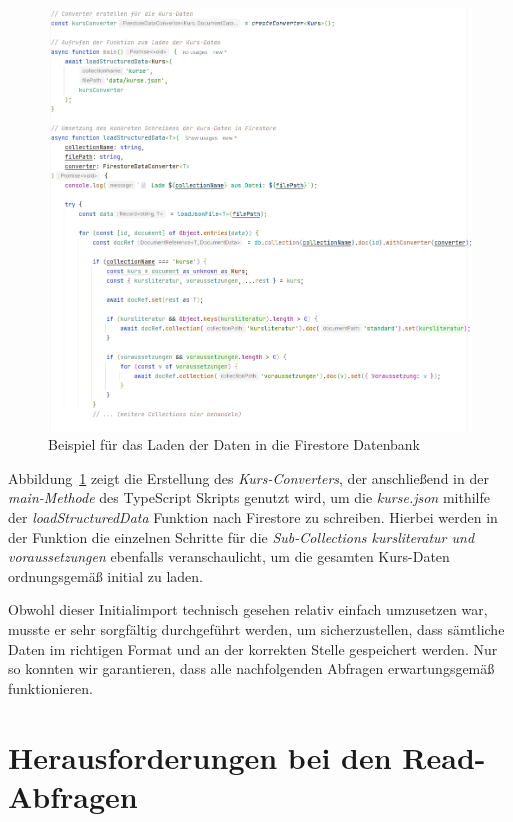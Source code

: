 \documentclass[12pt,a4paper%
              ,oneside     %
              ,titlepage
              ,DIV=13
              ,headinclude
              ,footinclude=false%
              ,cleardoublepage=empty%
              ,parskip=half,
              BCOR=0mm,
              ]{scrreprt}
\begin{document}
\begin{figure}[H]
	\centering
	\includegraphics[width=\dimexpr0.9\linewidth]{img/schreiben_beispiel.png}
	\caption{Beispiel für das Laden der Daten in die Firestore Datenbank}
	\label{fig:load_example}
\end{figure}

Abbildung~\ref{fig:load_example} zeigt die Erstellung des \textit{Kurs-Converters}, der anschließend in der \textit{main-Methode} des TypeScript Skripts genutzt wird, um die \textit{kurse.json} mithilfe der \textit{loadStructuredData} Funktion nach Firestore zu schreiben. Hierbei werden in der Funktion die einzelnen Schritte für die \textit{Sub-Collections kursliteratur und voraussetzungen} ebenfalls veranschaulicht, um die gesamten Kurs-Daten ordnungsgemäß initial zu laden.

Obwohl dieser Initialimport technisch gesehen relativ einfach umzusetzen war, musste er sehr sorgfältig durchgeführt werden, um sicherzustellen, dass sämtliche Daten im richtigen Format und an der korrekten Stelle gespeichert werden. Nur so konnten wir garantieren, dass alle nachfolgenden Abfragen erwartungsgemäß funktionieren.

\chapter{Herausforderungen bei den Read-Abfragen}
\end{document}
